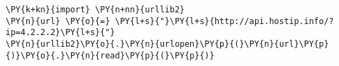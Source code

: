 \begin{Verbatim}[commandchars=\\\{\}]
\PY{k+kn}{import} \PY{n+nn}{urllib2}
\PY{n}{url} \PY{o}{=} \PY{l+s}{"}\PY{l+s}{http://api.hostip.info/?ip=4.2.2.2}\PY{l+s}{"}
\PY{n}{urllib2}\PY{o}{.}\PY{n}{urlopen}\PY{p}{(}\PY{n}{url}\PY{p}{)}\PY{o}{.}\PY{n}{read}\PY{p}{(}\PY{p}{)}
\end{Verbatim}
